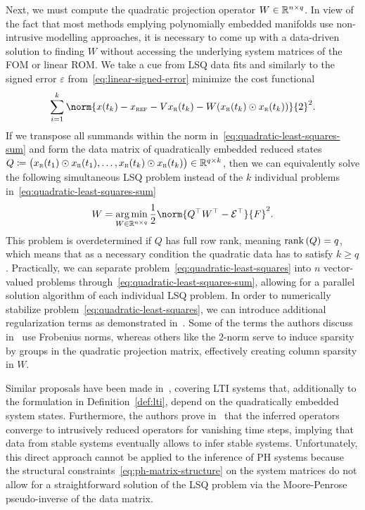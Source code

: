 Next, we must compute the quadratic projection operator $W \in \mathbb{R}^{n \times q}$.
In view of the fact that most methods emplying polynomially embedded manifolds use non-intrusive modelling approaches, it is necessary to come up with a data-driven solution to finding $W$ without accessing the underlying system matrices of the \ac{FOM} or linear \ac{ROM}.
We take a cue from \ac{LSQ} data fits and similarly to the signed error $\varepsilon$ from~\eqref{eq:linear-signed-error} minimize the cost functional
\begin{equation}\label{eq:quadratic-least-squares-sum}
    \sum\limits_{i = 1}^k \norm{x(t_k) - x_\msc{ref} - V x_\msc{r}(t_k) - W (x_\msc{r}(t_k) \odot x_\msc{r}(t_k))}{2}^2.
\end{equation}
If we transpose all summands within the norm in~\eqref{eq:quadratic-least-squares-sum} and form the data matrix of quadratically embedded reduced states $Q \coloneqq {\big( x_{\textnormal{\scshape r}}(t_1) \odot x_{\textnormal{\scshape r}}(t_1), \dots, x_{\textnormal{\scshape r}}(t_k) \odot x_{\textnormal{\scshape r}}(t_k) \big)} \in \mathbb{R}^{q \times k}$, then we can equivalently solve the following simultaneous \ac{LSQ} problem instead of the $k$ individual problems in~\eqref{eq:quadratic-least-squares-sum}
\begin{equation}\label{eq:quadratic-least-squares}
    W = \argmin\limits_{W \in \bb{R}^{n \times q}} \frac{1}{2} \norm{Q\trans W\trans - \mcl{E}\trans}{F}^2.
\end{equation}
This problem is overdetermined if $Q$ has full row rank, meaning $\mathop{}\!\mathrm{rank}\left(Q\right) = q$, which means that as a necessary condition the quadratic data has to satisfy $k \geq q$.
Practically, we can separate problem~\eqref{eq:quadratic-least-squares} into $n$ vector-valued problems through~\eqref{eq:quadratic-least-squares-sum}, allowing for a parallel solution algorithm of each individual \ac{LSQ} problem.
In order to numerically stabilize problem~\eqref{eq:quadratic-least-squares}, we can introduce additional regularization terms as demonstrated in~\cite[Equation~15]{Geelen2023}.
Some of the terms the authors discuss in~\cite{Geelen2023} use Frobenius norms, whereas others like the $2$-norm serve to induce sparsity by groups in the quadratic projection matrix, effectively creating column sparsity in $W$.

Similar proposals have been made in~\cite{Peherstorfer2016}, covering \ac{LTI} systems that, additionally to the formulation in Definition~\ref{def:lti}, depend on the quadratically embedded system states.
Furthermore, the authors prove in~\cite[Theorem~1, Corollary~1]{Peherstorfer2016} that the inferred operators converge to intrusively reduced operators for vanishing time steps, implying that data from stable systems eventually allows to infer stable systems.
Unfortunately, this direct approach cannot be applied to the inference of \ac{PH} systems because the structural constraints~\eqref{eq:ph-matrix-structure} on the system matrices do not allow for a straightforward solution of the \ac{LSQ} problem via the Moore-Penrose pseudo-inverse of the data matrix.
